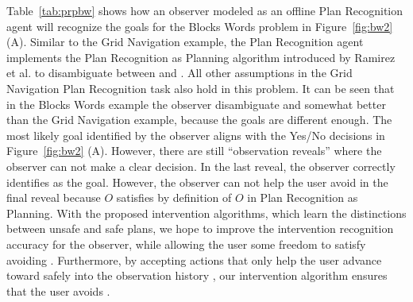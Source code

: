 Table~\ref{tab:prpbw} shows how an observer modeled as an offline Plan Recognition agent will recognize the goals for the Blocks Words problem in Figure~\ref{fig:bw2} (A). Similar to the Grid Navigation example, the Plan Recognition agent implements the Plan Recognition as Planning algorithm introduced by Ramirez et al. \citeyear{ramirez2010probabilistic} to disambiguate between \undesired and \desired. All other assumptions in the Grid Navigation Plan Recognition task also hold in this problem.
It can be seen that in the Blocks Words example the observer disambiguate  \undesired and \desired somewhat better than the Grid Navigation example, because the goals are different enough.
The most likely goal identified by the observer aligns with the Yes/No decisions in Figure~\ref{fig:bw2} (A). 
However, there are still ``observation reveals'' where the observer can not make a clear decision.
In the last reveal, the observer correctly identifies \undesired as the goal. However, the observer can not help the user avoid \undesired in the final reveal because $O$ satisfies \undesired by definition of $O$ in Plan Recognition as Planning. 
With the proposed intervention algorithms, which learn the distinctions between unsafe and safe plans, we hope to improve the intervention recognition accuracy for the observer, while allowing the user some freedom to satisfy \desired avoiding \undesired.
Furthermore, by accepting actions that only help the user advance toward \desired safely into the observation history \historyDef, our intervention algorithm ensures that the user avoids \undesired.

